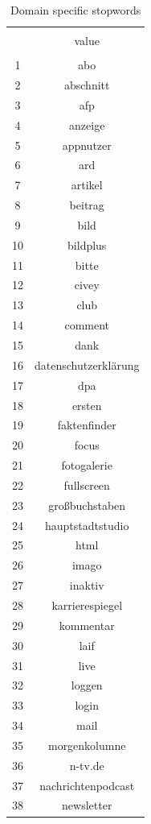 \documentclass[
  12pt,
]{article}
\begin{document}
\begin{table}[!htbp] \centering 
  \caption{Domain specific stopwords} 
  \label{table:stop_words} 
\tiny 
\begin{tabular}{@{\extracolsep{5pt}} cc} 
\\[-1.8ex]\hline 
\hline \\[-1.8ex] 
 & value \\ 
\hline \\[-1.8ex] 
1 & abo \\ 
2 & abschnitt \\ 
3 & afp \\ 
4 & anzeige \\ 
5 & appnutzer \\ 
6 & ard \\ 
7 & artikel \\ 
8 & beitrag \\ 
9 & bild \\ 
10 & bildplus \\ 
11 & bitte \\ 
12 & civey \\ 
13 & club \\ 
14 & comment \\ 
15 & dank \\ 
16 & datenschutzerklärung \\ 
17 & dpa \\ 
18 & ersten \\ 
19 & faktenfinder \\ 
20 & focus \\ 
21 & fotogalerie \\ 
22 & fullscreen \\ 
23 & großbuchstaben \\ 
24 & hauptstadtstudio \\ 
25 & html \\ 
26 & imago \\ 
27 & inaktiv \\ 
28 & karrierespiegel \\ 
29 & kommentar \\ 
30 & laif \\ 
31 & live \\ 
32 & loggen \\ 
33 & login \\ 
34 & mail \\ 
35 & morgenkolumne \\ 
36 & n-tv.de \\ 
37 & nachrichtenpodcast \\ 
38 & newsletter \\ 

\end{tabular}
\end{table}
\end{document}
